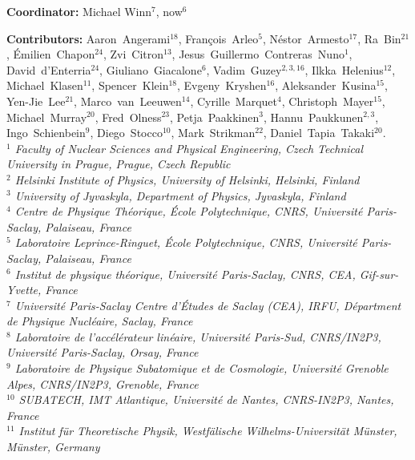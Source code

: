 \centerline{\small {\bf Coordinator:} Michael Winn$^7$, now$^6$ }
\begin{flushleft}
\small
{\bf Contributors:}
 Aaron~Angerami$^{18}$, 
 Fran\c{c}ois~Arleo$^5$, 
 N{\'e}stor~Armesto$^{17}$, 
 Ra~Bin$^{21}$, 
 {\'E}milien~Chapon$^{24}$, 
 Zvi~Citron$^{13}$,
 Jesus~Guillermo~Contreras~Nuno$^1$, 
 David~d'Enterria$^{24}$,
 Giuliano~Giacalone$^6$, 
 Vadim~Guzey$^{2,3,16}$,  
 Ilkka~Helenius$^{12}$, 
 Michael~Klasen$^{11}$, 
 Spencer~Klein$^{18}$, 
 Evgeny~Kryshen$^{16}$, 
 Aleksander~Kusina$^{15}$, 
 Yen-Jie~Lee$^{21}$,  
 Marco~van~Leeuwen$^{14}$,  
 Cyrille~Marquet$^{4}$, 
 Christoph~Mayer$^{15}$, 
 Michael~Murray$^{20}$,
 Fred~Olness$^{23}$, 
 Petja~Paakkinen$^{3}$,  
 Hannu~Paukkunen$^{2,3}$,  
 Ingo~Schienbein$^{9}$, 
 Diego~Stocco$^{10}$,  
 Mark~Strikman$^{22}$,
 Daniel~Tapia~Takaki$^{20}$.
 \bigskip
 \\
{\footnotesize \it  
${ ^{1}}$ Faculty of Nuclear Sciences and Physical Engineering, Czech Technical University in Prague, Prague, Czech Republic\\
${^2}$ Helsinki Institute of Physics, University of Helsinki, Helsinki, Finland\\
${^3}$ University of Jyvaskyla, Department of Physics,   Jyvaskyla, Finland\\
${^4}$ Centre de Physique Th{\'e}orique, {\'E}cole Polytechnique, CNRS, Universit{\'e} Paris-Saclay, Palaiseau,  France\\
${^5}$ Laboratoire Leprince-Ringuet, {\'E}cole Polytechnique, CNRS, Universit{\'e} Paris-Saclay, Palaiseau,  France\\
${^6}$ Institut de physique th{\'e}orique, Universit{\'e} Paris-Saclay, CNRS, CEA, Gif-sur-Yvette, France \\
${^7}$ Universit{\'e} Paris-Saclay Centre d'{\'E}tudes de Saclay (CEA), IRFU, D{\'e}partment de Physique Nucl{\'e}aire, Saclay, France \\
${^8}$ Laboratoire de l'acc{\'e}l{\'e}rateur lin{\'e}aire, Universit{\'e} Paris-Sud, CNRS/IN2P3, Universit{\'e} Paris-Saclay, Orsay, France\\
${^9}$ Laboratoire de Physique Subatomique et de Cosmologie, Universit{\'e} Grenoble Alpes, CNRS/IN2P3, Grenoble, France\\
${^{10}}$ SUBATECH, IMT Atlantique, Universit{\'e} de Nantes, CNRS-IN2P3, Nantes, France\\
${^{11}}$ Institut  f{\"u}r  Theoretische  Physik,  Westf{\"a}lische  Wilhelms-Universit{\"a}t  M{\"u}nster, M{\"u}nster,  Germany\\
}
\end{flushleft}
